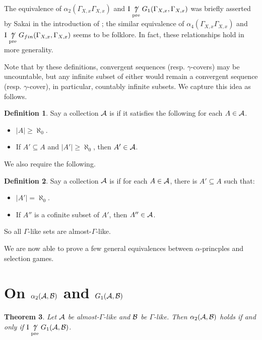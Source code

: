 \documentclass{amsart}
\theoremstyle{plain}
\newtheorem{theorem}{Theorem}
\theoremstyle{definition}
\newtheorem{definition}[theorem]{Definition}
\theoremstyle{remark}
\theoremstyle{plain}
\theoremstyle{definition}
\theoremstyle{remark}
\begin{document}
The equivalence of \(\alpha_2(\Gamma_{X,x}\Gamma_{X,x})\) and 
\(\mathrm{I}\underset{\text{pre}}{\not\uparrow} G_1(\Gamma_{X,x},\Gamma_{X,x})\) was briefly asserted by Sakai
in the introduction of \cite{MR2280899}; the similar
equivalence of \(\alpha_4(\Gamma_{X,x}\Gamma_{X,x})\) and 
\(\mathrm{I}\underset{\text{pre}}{\not\uparrow} G_{fin}(\Gamma_{X,x},\Gamma_{X,x})\) seems to be folklore.
In fact, these relationships hold in more generality.

Note that by these definitions, convergent sequences (resp. \(\gamma\)-covers) may be uncountable,
but any infinite subset of either would remain a convergent sequence (resp. \(\gamma\)-cover),
in particular, countably infinite subsets. We capture this idea as follows.

\begin{definition}
Say a collection \(\mathcal{A}\) is  if it satisfies the following
for each \(A\in\mathcal{A}\).
\begin{itemize}
\item \(|A|\geq\aleph_0\).
\item If \(A'\subseteq A\) and \(|A'|\geq\aleph_0\), then \(A'\in\mathcal{A}\).
\end{itemize}
\end{definition}

We also require the following.

\begin{definition}
Say a collection \(\mathcal{A}\) is  if
for each \(A\in\mathcal{A}\), there is \(A'\subseteq A\) such that:
\begin{itemize}
\item \(|A'|=\aleph_0\).
\item If \(A''\) is a cofinite subset of \(A'\), then \(A''\in\mathcal{A}\).
\end{itemize}
\end{definition}

So all \(\Gamma\)-like sets are almost-\(\Gamma\)-like.

We are now able to prove a few general equivalences between \(\alpha\)-princples
and selection games.

\section{On \(\alpha_2(\mathcal{A},\mathcal{B})\) and \(G_1(\mathcal{A},\mathcal{B})\)}

\begin{theorem}
Let \(\mathcal{A}\) be almost-\(\Gamma\)-like and \(\mathcal{B}\) be \(\Gamma\)-like. 
Then \(\alpha_2(\mathcal{A},\mathcal{B})\) holds if and only
if \(\mathrm{I}\underset{\text{pre}}{\not\uparrow} G_1(\mathcal{A},\mathcal{B})\).
\end{theorem}
\end{document}
